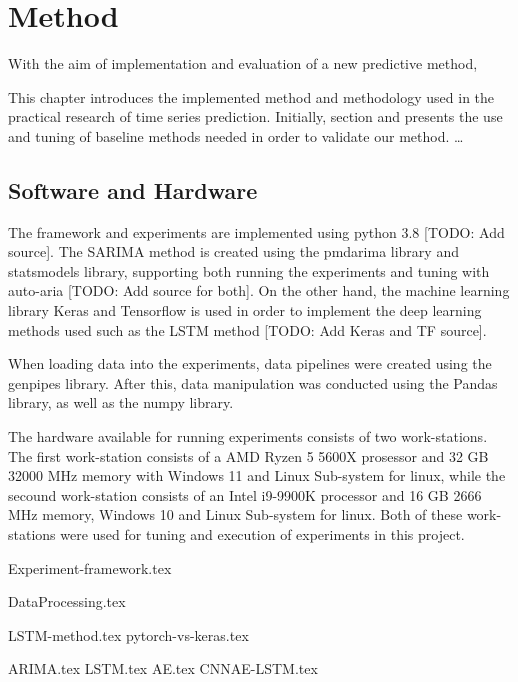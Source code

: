 \chapter{Method}
\label{section:Method}

With the aim of implementation and evaluation of a new predictive method,

This chapter introduces the implemented method and methodology used in the practical research of time series prediction.
Initially, section  and  presents the use and tuning of baseline methods needed in order to validate our method.
\dots

\section{Software and Hardware}

The framework and experiments are implemented using python 3.8 [TODO: Add source].
The SARIMA method is created using the pmdarima library and statsmodels library,
supporting both running the experiments and tuning with auto-aria [TODO: Add source for both].
On the other hand, the machine learning library Keras and Tensorflow is used in order to implement the deep learning methods used such as the LSTM method [TODO: Add Keras and TF source].

When loading data into the experiments, data pipelines were created using the genpipes library.
After this, data manipulation was conducted using the Pandas library, as well as the numpy library.


The hardware available for running experiments consists of two work-stations.
The first work-station consists of a AMD Ryzen 5 5600X prosessor and 32 GB 32000 MHz memory with Windows 11 and Linux Sub-system for linux,
while the secound work-station consists of an Intel i9-9900K processor and 16 GB 2666 MHz memory, Windows 10 and Linux Sub-system for linux.
Both of these work-stations were used for tuning and execution of experiments in this project.


{Experiment-framework.tex}

{DataProcessing.tex}

{LSTM-method.tex}
{pytorch-vs-keras.tex}


{ARIMA.tex}
{LSTM.tex}
{AE.tex}
{CNNAE-LSTM.tex}
